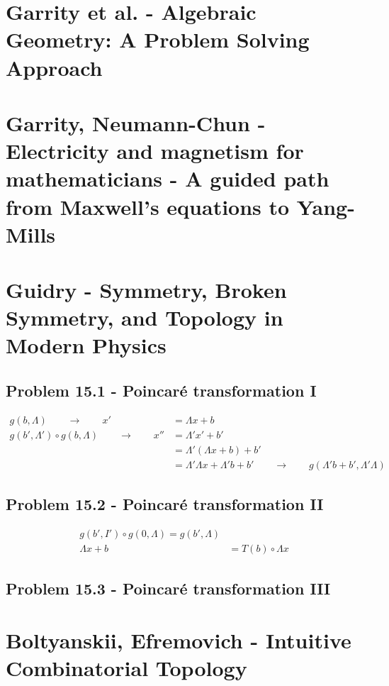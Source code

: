 \documentclass[../main.tex]{subfiles}
\begin{document}
\section{{\sc Garrity} et al. - Algebraic Geometry: A Problem Solving Approach}

\section{{\sc Garrity, Neumann-Chun} - Electricity and magnetism for mathematicians - A guided path from Maxwell's equations to Yang-Mills}

\section{{\sc Guidry} - Symmetry, Broken Symmetry, and Topology in Modern Physics}

\subsection{Problem 15.1 - Poincaré transformation I}
\begin{align}
g(b,\Lambda)\qquad\rightarrow\qquad x'&=\Lambda x+b\\
g(b',\Lambda')\circ g(b,\Lambda)\qquad\rightarrow\qquad x''&=\Lambda'x'+b'\\
&=\Lambda'(\Lambda x+b)+b'\\
&=\Lambda'\Lambda x+\Lambda'b+b'\qquad\rightarrow\qquad g(\Lambda'b+b',\Lambda'\Lambda)
\end{align}

\subsection{Problem 15.2 - Poincaré transformation II}
\begin{align}
g(b',I')\circ g(0,\Lambda)= g(b',\Lambda)\\
\Lambda x + b&=T(b)\circ\Lambda x
\end{align}

\subsection{Problem 15.3 - Poincaré transformation III}

\section{{\sc Boltyanskii, Efremovich} - Intuitive Combinatorial Topology}
\end{document}

